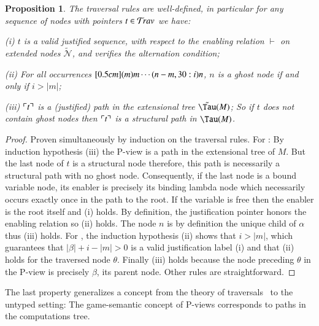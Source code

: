 \documentclass{elsarticle}
\def\shortproof{\begin{proof}}
\def\endshortproof{\end{proof}}
\theoremstyle{plain}
\newtheorem{proposition}[theorem]{Proposition}
\theoremstyle{definition}
\newcommand\Nodes{\mathcal{N}}%
\newcommand{\ghostvar}{\theta}
\newcommand\ExtendedNodes{\tilde{\Nodes}}
\newcommand{\enables}{\vdash} %
\newcommand{\ctree}{\Tau} %
\newcommand{\exttree}{\tilde{\Tau}} %
\newcommand{\ExternalNodes}{\Nodes^{\sf ext}}
\begin{document}
\begin{proposition}
\label{prop:ulctrav_welldefined_pathview}
The traversal rules are well-defined, in particular for any sequence of nodes with pointers $t\in \mathcal{T}\!rav$ we have:
\begin{compactitem}
\item[(i)] $t$ is a valid justified sequence, with respect to
the enabling relation $\enables$ on extended nodes $\ExtendedNodes$, and verifies the alternation condition;
\item[(ii)] For all occurrences $\Pstr[0.5cm]{(m){m} \cdots (n-m,30:i){n}}$, $n$ is a ghost node if and only if $i > |m|$;
\item[(iii)] $\ulcorner t \urcorner$ is a (justified) path in the extensional tree $\exttree(M)$;
So if $t$ does not contain ghost nodes then $\ulcorner t \urcorner$ is a structural path in $\ctree(M)$.
\end{compactitem}
\end{proposition}
\shortproof
Proven simultaneously by induction on the traversal rules.
For : By induction hypothesis (iii) the P-view is a path in the extensional tree of $M$. But the last node of $t$ is a structural node therefore, this path is necessarily a structural path with no ghost node. Consequently, if the last node is a bound variable node, its enabler is precisely its binding lambda node which necessarily occurs exactly once in the path to the root. If the variable is free then the enabler is the root itself and (i) holds. By definition, the justification pointer honors the enabling relation so (ii) holds. The node $n$ is by definition the unique child of $\alpha$ thus (iii) holds.
%
For \rulenamet{Lam^\ghostvar}, the induction hypothesis (ii) shows that $i>|m|$, which guarantees that $|\beta|+i-|m|>0$ is a valid justification label (i) and that (ii) holds for the traversed node $\ghostvar$.
Finally (iii) holds because the node preceding $\ghostvar$ in the P-view is precisely $\beta$, its parent node.
%
Other rules are straightforward.
\endshortproof

The last property generalizes a concept from the theory of traversals~\cite{OngLics2006,BlumPhd} to the untyped setting: The game-semantic concept of P-views corresponds to paths in the computations tree.
\end{document}
